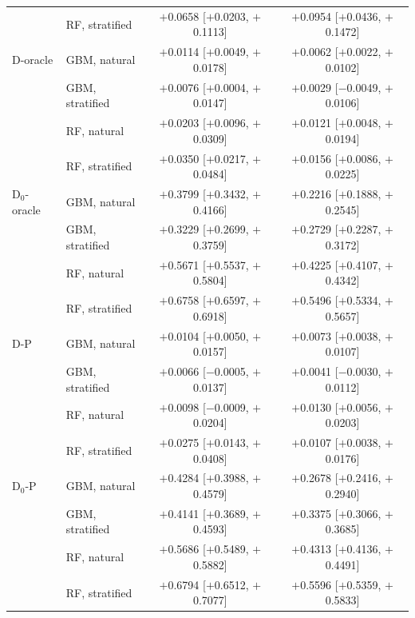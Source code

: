 \begin{longtable}{llcc}
 & RF, stratified & $+$0.0658 [$+$0.0203, $+$0.1113] & $+$0.0954 [$+$0.0436, $+$0.1472] \\
\addlinespace
D-oracle & GBM, natural & $+$0.0114 [$+$0.0049, $+$0.0178] & $+$0.0062 [$+$0.0022, $+$0.0102] \\
 & GBM, stratified & $+$0.0076 [$+$0.0004, $+$0.0147] & $+$0.0029 [$-$0.0049, $+$0.0106] \\
 & RF, natural & $+$0.0203 [$+$0.0096, $+$0.0309] & $+$0.0121 [$+$0.0048, $+$0.0194] \\
 & RF, stratified & $+$0.0350 [$+$0.0217, $+$0.0484] & $+$0.0156 [$+$0.0086, $+$0.0225] \\
\addlinespace
D$_0$-oracle & GBM, natural & $+$0.3799 [$+$0.3432, $+$0.4166] & $+$0.2216 [$+$0.1888, $+$0.2545] \\
 & GBM, stratified & $+$0.3229 [$+$0.2699, $+$0.3759] & $+$0.2729 [$+$0.2287, $+$0.3172] \\
 & RF, natural & $+$0.5671 [$+$0.5537, $+$0.5804] & $+$0.4225 [$+$0.4107, $+$0.4342] \\
 & RF, stratified & $+$0.6758 [$+$0.6597, $+$0.6918] & $+$0.5496 [$+$0.5334, $+$0.5657] \\
\addlinespace
D-P & GBM, natural & $+$0.0104 [$+$0.0050, $+$0.0157] & $+$0.0073 [$+$0.0038, $+$0.0107] \\
 & GBM, stratified & $+$0.0066 [$-$0.0005, $+$0.0137] & $+$0.0041 [$-$0.0030, $+$0.0112] \\
 & RF, natural & $+$0.0098 [$-$0.0009, $+$0.0204] & $+$0.0130 [$+$0.0056, $+$0.0203] \\
 & RF, stratified & $+$0.0275 [$+$0.0143, $+$0.0408] & $+$0.0107 [$+$0.0038, $+$0.0176] \\
\addlinespace
D$_0$-P & GBM, natural & $+$0.4284 [$+$0.3988, $+$0.4579] & $+$0.2678 [$+$0.2416, $+$0.2940] \\
 & GBM, stratified & $+$0.4141 [$+$0.3689, $+$0.4593] & $+$0.3375 [$+$0.3066, $+$0.3685] \\
 & RF, natural & $+$0.5686 [$+$0.5489, $+$0.5882] & $+$0.4313 [$+$0.4136, $+$0.4491] \\
 & RF, stratified & $+$0.6794 [$+$0.6512, $+$0.7077] & $+$0.5596 [$+$0.5359, $+$0.5833] \\
\bottomrule
\end{longtable}
